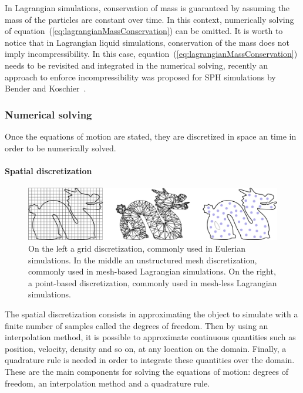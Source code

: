 In Lagrangian simulations, conservation of mass is guaranteed by assuming the mass of the particles are constant over time. In this context, numerically solving of equation~(\ref{eq:lagrangianMassConservation}) can be omitted. It is worth to notice that in Lagrangian liquid simulations, conservation of the mass does not imply incompressibility. In this case, equation~(\ref{eq:lagrangianMassConservation}) needs to be revisited and integrated in the numerical solving, recently an approach to enforce incompressibility was proposed for SPH simulations by Bender and Koschier~\cite{Bender2015}.

\subsubsection{Numerical solving}

Once the equations of motion are stated, they are discretized in space an time in order to be numerically solved.

\paragraph{Spatial discretization}

\begin{figure}[!ht]
\centering
\includegraphics[scale=0.2]{images/continuum_mechanics/discretization.png}
\caption[STAR mechanics: Discretization]{\label{fig:discretization} On the left a grid discretization, commonly used in Eulerian simulations. In the middle an unstructured mesh discretization, commonly used in mesh-based Lagrangian simulations. On the right, a point-based discretization, commonly used in mesh-less Lagrangian simulations.}
\end{figure}

The spatial discretization consists in approximating the object to simulate with a finite number of samples called the degrees of freedom. Then by using an interpolation method, it is possible to approximate continuous quantities such as position, velocity, density and so on,  at any location on the domain. Finally, a quadrature rule is needed in order to integrate these quantities over the domain. These are the main components for solving the equations of motion:
degrees of freedom, an interpolation method and a quadrature rule. 

